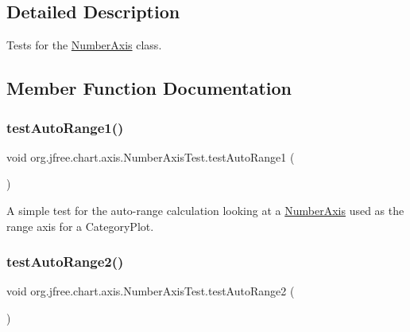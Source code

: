 \subsection{Detailed Description}
Tests for the \mbox{\hyperlink{classorg_1_1jfree_1_1chart_1_1axis_1_1_number_axis}{Number\+Axis}} class. 

\subsection{Member Function Documentation}
\mbox{\label{classorg_1_1jfree_1_1chart_1_1axis_1_1_number_axis_test_aa82eb6b8c2cee6c8ae36ebce678f85b6}} 
\subsubsection{\texorpdfstring{test\+Auto\+Range1()}{testAutoRange1()}}
{\footnotesize\ttfamily void org.\+jfree.\+chart.\+axis.\+Number\+Axis\+Test.\+test\+Auto\+Range1 (\begin{DoxyParamCaption}{ }\end{DoxyParamCaption})}

A simple test for the auto-\/range calculation looking at a \mbox{\hyperlink{classorg_1_1jfree_1_1chart_1_1axis_1_1_number_axis}{Number\+Axis}} used as the range axis for a Category\+Plot. \mbox{\label{classorg_1_1jfree_1_1chart_1_1axis_1_1_number_axis_test_a3e2c6866e6a2433083d9156ef6e78388}} 
\subsubsection{\texorpdfstring{test\+Auto\+Range2()}{testAutoRange2()}}
{\footnotesize\ttfamily void org.\+jfree.\+chart.\+axis.\+Number\+Axis\+Test.\+test\+Auto\+Range2 (\begin{DoxyParamCaption}{ }\end{DoxyParamCaption})}

